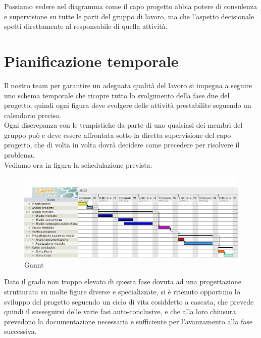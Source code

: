 \vspace*{0.5cm}

Possiamo vedere nel diagramma  come il capo progetto abbia potere di consulenza e supervisione su tutte le parti del gruppo di lavoro, ma che l'aspetto decisionale spetti direttamente al responsabile di quella attività.

\newpage

\section{Pianificazione temporale}

Il nostro team per garantire un adeguata qualità del lavoro si impegna a seguire uno schema temporale che ricopre tutto lo svolgimento della fase due del progetto, quindi ogni figura deve svolgere delle attività prestabilite seguendo un calendario preciso. \\Ogni discrepanza con le tempistiche da parte di uno qualsiasi dei membri del gruppo può e deve essere affrontata sotto la diretta supervisione del capo progetto, che di volta in volta dovrà decidere come precedere per risolvere il problema. \\Vediamo ora in figura  la schedulazione prevista:

\vspace*{0.5cm}

\begin{figure}[H]
\centering
\includegraphics[scale=0.4]{images/cap3/Gantt.png}
\caption{Gannt}
\end{figure}

\vspace*{0.5cm}

Dato il grado non troppo elevato di questa fase dovuta ad una progettazione strutturata su molte figure diverse e specializzate, si è ritenuto opportuno lo sviluppo del progetto seguendo un ciclo di vita cosiddetto a cascata, che prevede quindi il susseguirsi delle varie fasi auto-conclusive, e che alla loro chiusura prevedono la documentazione necessaria e sufficiente per l'avanzamento alla fase successiva.

